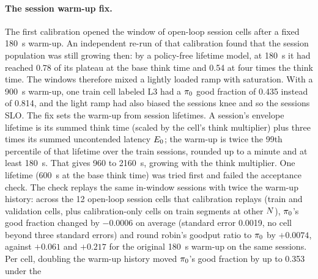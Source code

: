 \paragraph{The session warm-up fix.}
The first calibration opened the window of open-loop session cells after a fixed \SI{180}{s}
warm-up. An independent re-run of that calibration found that the session population was still
growing then: by a policy-free lifetime model, at \SI{180}{s} it had reached 0.78 of its plateau
at the base think time and 0.54 at four times the think time. The windows therefore mixed a
lightly loaded ramp with saturation. With a \SI{900}{s} warm-up, one train cell labeled L3 had a
$\pi_{0}$ good fraction of 0.435 instead of 0.814, and the light ramp had also biased the sessions
knee and so the sessions SLO.
The fix sets the warm-up from session lifetimes. A session's envelope lifetime is its summed think
time (scaled by the cell's think multiplier) plus three times its summed uncontended latency
$E_0$; the warm-up is twice the 99th percentile of that lifetime over the train sessions,
rounded up to a minute and at least \SI{180}{s}. That gives 960 to \SI{2160}{s}, growing with the
think multiplier. One lifetime (\SI{600}{s} at the base think time) was tried first and failed
the acceptance check. The check replays the same in-window sessions with twice the warm-up
history: across the 12 open-loop session cells that calibration replays (train and validation
cells, plus calibration-only cells on train segments at other $N$), $\pi_{0}$'s good
fraction changed by $-0.0006$ on average (standard error 0.0019, no cell beyond three standard
errors) and round robin's goodput ratio to $\pi_{0}$ by $+0.0074$, against $+0.061$ and $+0.217$
for the original \SI{180}{s} warm-up on the same sessions.
Per cell, doubling the warm-up history moved $\pi_{0}$'s good fraction by up to 0.353 under the
